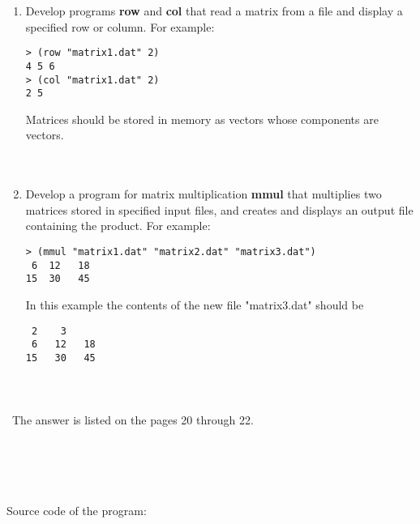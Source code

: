 \documentclass{article}
\begin{document}
	\begin{enumerate}[label=(\alph*)]

	\item Develop programs \textbf{row} and \textbf{col} that read a matrix from a file and display a specified row or column. For example:
	
\begin{verbatim}
> (row "matrix1.dat" 2)
4 5 6
> (col "matrix1.dat" 2)
2 5
\end{verbatim}
	
	Matrices should be stored in memory as vectors whose components are vectors.
	\paragraph{}\
	
	\item Develop a program for matrix multiplication \textbf{mmul} that multiplies two matrices stored in specified input files, and creates and displays an output file containing the product. For example:
	
\begin{verbatim}
> (mmul "matrix1.dat" "matrix2.dat" "matrix3.dat")
 6  12   18
15  30   45
\end{verbatim}
In this example the contents of the new file "matrix3.dat" should be

\begin{verbatim}
 2    3
 6   12   18
15   30   45
\end{verbatim}
					
	\end{enumerate}
	
\paragraph{}\
\paragraph{}\
	The answer is listed on the pages 20 through 22.
\paragraph{}\
\paragraph{}\

Source code of the program:
\end{document}
